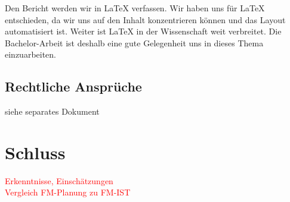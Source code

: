 \documentclass[a4paper,ngerman, 11pt, pagesize]{report}
\newcommand\Diskussionspunkt[1]{\textcolor{red}{#1}}
\begin{document}
Den Bericht werden wir in LaTeX verfassen. Wir haben uns für LaTeX entschieden, da wir uns auf den Inhalt konzentrieren können und das Layout automatisiert ist. Weiter ist LaTeX in der Wissenschaft weit verbreitet. Die Bachelor-Arbeit ist deshalb eine gute Gelegenheit uns in dieses Thema einzuarbeiten.


\section{Rechtliche Ansprüche}
siehe separates Dokument


\chapter{Schluss}
\Diskussionspunkt{Erkenntnisse, Einschätzungen}\\
\Diskussionspunkt{Vergleich FM-Planung zu FM-IST}




{}	

\end{document}
